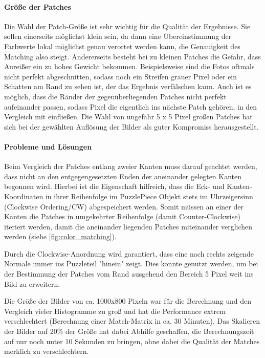 \paragraph{Größe der Patches}
Die Wahl der Patch-Größe ist sehr wichtig für die Qualität der Ergebnisse. Sie sollen einerseits möglichst klein sein, da dann eine Übereinstimmung der Farbwerte lokal möglichst genau verortet werden kann, die Genauigkeit des Matching also steigt. Andererseits besteht bei zu kleinen Patches die Gefahr, dass Aureißer ein zu hohes Gewicht bekommen. Beispielsweise sind die Fotos oftmals nicht perfekt abgeschnitten, sodass noch ein Streifen grauer Pixel oder ein Schatten am Rand zu sehen ist, der das Ergebnis verfälschen kann. Auch ist es möglich, dass die Ränder der gegenüberliegenden Patches nicht perfekt aufeinander passen, sodass Pixel die eigentlich ins nächste Patch gehören, in den Vergleich mit einfließen. Die Wahl von ungefähr 5 x 5 Pixel großen Patches hat sich bei der gewählten Auflösung der Bilder als guter Kompromiss herausgestellt.

\paragraph{Probleme und Lösungen}
Beim Vergleich der Patches entlang zweier Kanten muss darauf geachtet werden, dass nicht an den entgegengesetzten Enden der aneinander gelegten Kanten begonnen wird. Hierbei ist die Eigenschaft hilfreich, dass die Eck- und Kanten-Koordinaten in ihrer Reihenfolge im PuzzlePiece Objekt stets im Uhrzeigersinn (Clockwise Ordering/CW) abgespeichert werden. Somit müssen an einer der Kanten die Patches in umgekehrter Reihenfolge (damit Counter-Clockwise) iteriert werden, damit die aneinander liegenden Patches miteinander verglichen werden (siehe \autoref{fig:color_matching}).

Durch die Clockwise-Anordnung wird garantiert, dass eine nach rechts zeigende Normale immer ins Puzzleteil "hinein" zeigt. Dies konnte genutzt werden, um bei der Bestimmung der Patches vom Rand ausgehend den Bereich 5 Pixel weit ins Bild zu erweitern.

Die Größe der Bilder von ca. 1000x800 Pixeln war für die Berechnung und den Vergleich vieler Histogramme zu groß und hat die Performance extrem verschlechtert (Berechnung einer Match-Matrix in ca. 30 Minuten). Das Skalieren der Bilder auf 20\% der Größe hat dabei Abhilfe geschaffen, die Berechnungszeit auf nur noch unter 10 Sekunden zu bringen, ohne dabei die Qualität der Matches merklich zu verschlechtern.

